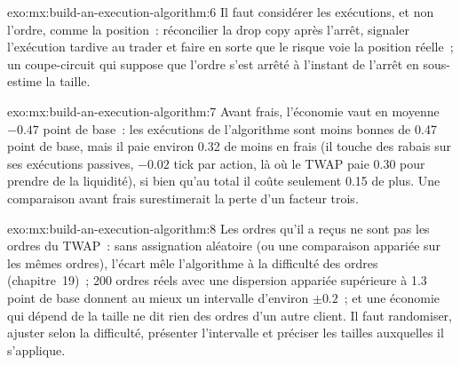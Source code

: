 \begin{solution}{exo:mx:build-an-execution-algorithm:6}
Il faut considérer les exécutions, et non l'ordre, comme la position~: réconcilier la drop copy après l'arrêt, signaler l'exécution tardive au trader et faire en sorte que le risque voie la position réelle~;
un coupe-circuit qui suppose que l'ordre s'est arrêté à l'instant de l'arrêt en sous-estime la taille.
\end{solution}

\begin{solution}{exo:mx:build-an-execution-algorithm:7}
Avant frais, l'économie vaut en moyenne $-0.47$ point de base~: les exécutions de l'algorithme sont moins bonnes de 0.47 point de base, mais il paie environ 0.32 de moins en frais
(il touche des rabais sur ses exécutions passives, $-0.02$ tick par action, là où le TWAP paie 0.30 pour prendre de la liquidité), si bien qu'au total il coûte seulement 0.15 de plus. Une comparaison avant
frais surestimerait la perte d'un facteur trois.
\end{solution}

\begin{solution}{exo:mx:build-an-execution-algorithm:8}
Les ordres qu'il a reçus ne sont pas les ordres du TWAP~: sans assignation aléatoire (ou une comparaison appariée sur les mêmes ordres), l'écart mêle
l'algorithme à la difficulté des ordres (chapitre~19)~; 200 ordres réels avec une dispersion appariée supérieure à 1.3 point de base donnent au mieux
un intervalle d'environ $\pm0.2$~; et une économie qui dépend de la taille ne dit rien des ordres d'un autre client. Il faut randomiser, ajuster selon la difficulté, présenter
l'intervalle et préciser les tailles auxquelles il s'applique.
\end{solution}

